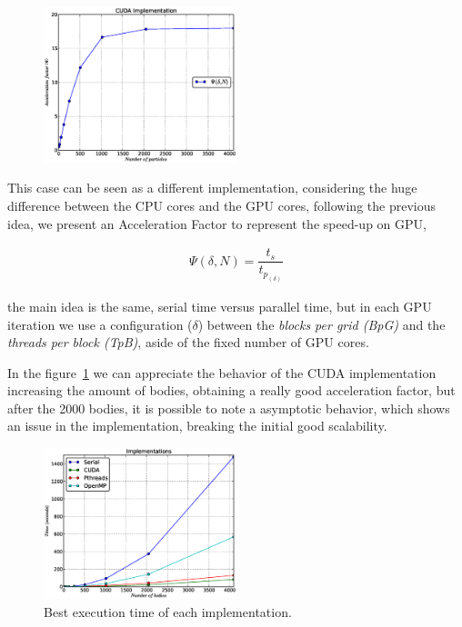 \begin{figure}[h!t]
    \centering
    \includegraphics[width=0.5\textwidth]{images/cuda.eps}
    \label{fig:cuda}
\end{figure}

This case can be seen as a different implementation,
considering the huge difference between the CPU cores and the GPU cores,
following the previous idea, we present an Acceleration Factor to represent the speed-up on GPU,

\begin{eqnarray}
    \Psi(\delta,N) = \dfrac{t_{s}}{t_{p_{(\delta)}}} 
\end{eqnarray}

the main idea is the same, serial time versus parallel time,
but in each GPU iteration we use a configuration ($\delta$) between the
\emph{blocks per grid (BpG)} and the \emph{threads per block (TpB)},
aside of the fixed number of GPU cores.

In the figure~\ref{fig:cuda} we can appreciate
the behavior of the CUDA implementation increasing the amount of bodies,
obtaining a really good acceleration factor,
but after the 2000 bodies, it is possible to note
a asymptotic behavior, which shows an issue in the implementation,
breaking the initial good scalability.

\begin{figure}[h!t]
    \centering
    \includegraphics[width=0.5\textwidth]{images/all.eps}
    \caption{Best execution time of each implementation.}
    \label{fig:all}
\end{figure}

